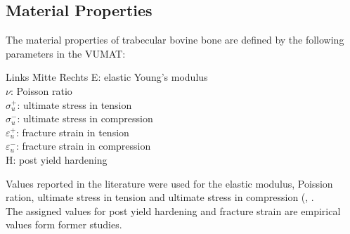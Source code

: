 \documentclass[12pt, a4paper, twoside]{report}
\begin{document}
\subsection{Material Properties}
%
The material properties of trabecular bovine bone are defined by the following parameters in the VUMAT:\\
%
\begin{tabbing}
	Links \= Mitte \= Rechts \kill
	E:\> elastic Young's modulus\\
	\(\nu\):\> Poisson ratio\\
	\(\sigma^{+}_{u}\):\> ultimate stress in tension\\
	\(\sigma^{-}_{u}\):\> ultimate stress in compression\\
	\(\varepsilon^{+}_{u}\):\> fracture strain in tension\\
	\(\varepsilon^{-}_{u}\):\> fracture strain in compression\\
	H:\> post yield hardening\\
\end{tabbing}
%
Values reported in the literature were used for the elastic modulus, Poission ration, ultimate stress in tension and ultimate stress in compression (\cite{Werner_2019_IntJNumerMethodBiomedEng}, \cite{Ovesy_2019_JMechBehavBiomedMater}.\\
The assigned values for post yield hardening and fracture strain are empirical values form former studies.
%
\begin{table}[H]
\caption{Material properties of the VUMAT used in the present (bottom row) and in the previous study of \cite{Ovesy_2019_JMechBehavBiomedMater} (top row).}
\label{tab:material}
\end{table}
%
\end{document}
